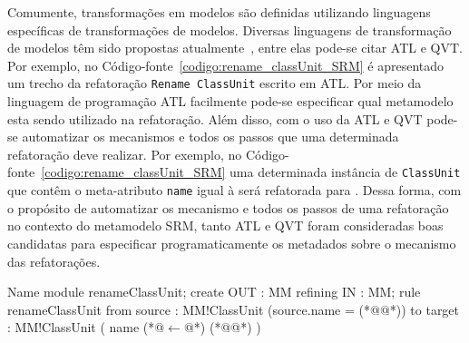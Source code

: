 Comumente, transformações em modelos são definidas utilizando linguagens específicas de transformações de modelos. Diversas linguagens de transformação de modelos têm sido propostas atualmente~\cite{Biehl_2010, Allilaire_06}, entre elas pode-se citar ATL e QVT. Por exemplo, no Código-fonte~\ref{codigo:rename_classUnit_SRM} é apresentado um trecho da refatoração \texttt{Rename ClassUnit} escrito em ATL. Por meio da linguagem de programação ATL facilmente pode-se especificar qual metamodelo esta sendo utilizado na refatoração. Além disso, com o uso da ATL e QVT pode-se automatizar os mecanismos e todos os passos que uma determinada refatoração deve realizar. Por exemplo, no Código-fonte~\ref{codigo:rename_classUnit_SRM} uma determinada instância de \texttt{ClassUnit} que contêm o meta-atributo \texttt{name} igual à  será refatorada para . Dessa forma, com o propósito de automatizar os mecanismo e todos os passos de uma refatoração no contexto do metamodelo SRM, tanto ATL e QVT foram consideradas boas candidatas para especificar programaticamente os metadados sobre o mecanismo das refatorações. %


\begin{codigo}[caption={[Refatoração \textit{Rename ClassUnit}.] Refatoração \textit{Rename ClassUnit}.},escapeinside={(*@}{@*)}, basicstyle=\footnotesize, label={codigo:rename_classUnit_SRM}, language=ATL]{Name}
module renameClassUnit;
create OUT : MM refining IN : MM;
rule renameClassUnit {
	from
		source : MM!ClassUnit (source.name = (*@@*))
	to 
		target : MM!ClassUnit (
			name (*@$\leftarrow$@*) (*@@*)
		)
}
\end{codigo}




